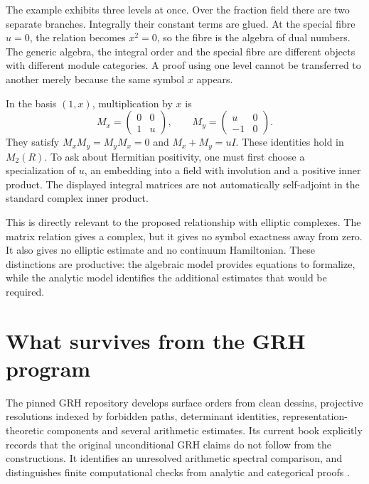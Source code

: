 The example exhibits three levels at once. Over the fraction field there are two separate branches. Integrally their constant terms are glued. At the special fibre $u=0$, the relation becomes $x^2=0$, so the fibre is the algebra of dual numbers. The generic algebra, the integral order and the special fibre are different objects with different module categories. A proof using one level cannot be transferred to another merely because the same symbol $x$ appears.

\begin{example}
In the basis $(1,x)$, multiplication by $x$ is
\[
 M_x=\begin{pmatrix}0&0\\1&u\end{pmatrix},\qquad
 M_y=\begin{pmatrix}u&0\\-1&0\end{pmatrix}.
\]
They satisfy $M_xM_y=M_yM_x=0$ and $M_x+M_y=uI$. These identities hold in $M_2(R)$. To ask about Hermitian positivity, one must first choose a specialization of $u$, an embedding into a field with involution and a positive inner product. The displayed integral matrices are not automatically self-adjoint in the standard complex inner product.
\end{example}

This is directly relevant to the proposed relationship with elliptic complexes. The matrix relation gives a complex, but it gives no symbol exactness away from zero. It also gives no elliptic estimate and no continuum Hamiltonian. These distinctions are productive: the algebraic model provides equations to formalize, while the analytic model identifies the additional estimates that would be required.

\section{What survives from the GRH program}
The pinned GRH repository develops surface orders from clean dessins, projective resolutions indexed by forbidden paths, determinant identities, representation-theoretic components and several arithmetic estimates. Its current book explicitly records that the original unconditional GRH claims do not follow from the constructions. It identifies an unresolved arithmetic spectral comparison, and distinguishes finite computational checks from analytic and categorical proofs \cite{GRHRepo}.

